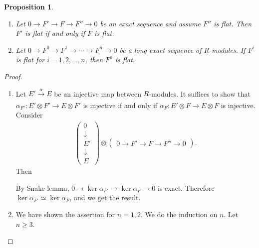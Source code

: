 \documentclass[12pt]{report}
\theoremstyle{plain}
\newtheorem{proposition}[theorem]{Proposition}
\theoremstyle{remark}
\theoremstyle{definition}
\begin{document}
\begin{proposition}
    \begin{enumerate}
        \item Let $0\to F'\to F\to F''\to 0$ be an exact sequence and assume $F''$ is flat. Then $F'$ is flat if and only if $F$ is flat.
        \item Let $0\to F^0\to F^1\to\cdots\to F^n\to 0$ be a long exact sequence of $R$-modules. If $F^i$ is flat for $i=1,2,\dots,n$, then $F^0$ is flat.
    \end{enumerate}
\end{proposition}
\begin{proof}
    \begin{enumerate}
        \item Let $E'\xrightarrow[]{\alpha}E$ be an injective map between $R$-modules. It suffices to show that $\alpha_{F'}:E'\otimes F'\to E\otimes F'$ is injective if and only if $\alpha_F:E'\otimes F\to E\otimes F$ is injective. Consider
        \begin{align*}
            \begin{pmatrix}
                0 \\ \downarrow \\ E' \\ \downarrow \\ E
            \end{pmatrix}\otimes \begin{pmatrix}
                0\to F'\to F\to F''\to 0
            \end{pmatrix}.
        \end{align*}
        Then
        \begin{figure}[H]
            \centering
        \end{figure}
        \noindent By Snake lemma, $0\to \ker\alpha_{F'}\to \ker\alpha_F\to 0$ is exact. Therefore $\ker\alpha_{F'}\simeq \ker\alpha_F$, and we get the result.
        \item We have shown the assertion for $n=1,2$. We do the induction on $n$. Let $n\ge 3$. 
    \end{enumerate}
\end{proof}
\end{document}
